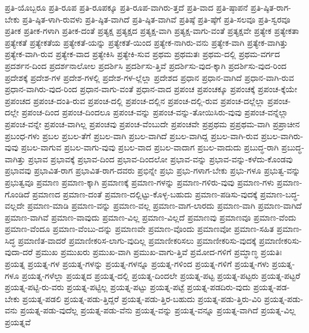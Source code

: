 {ಪ್ರತಿ-ಯೊಬ್ಬರೂ
ಪ್ರತಿ-ರೂಪ
ಪ್ರತಿ-ರೂಪಕ್ಕೂ
ಪ್ರತಿ-ರೂಪ-ವಾಗಿರು-ತ್ತದೆ
ಪ್ರತಿ-ವಾದ
ಪ್ರತಿ-ಷ್ಠಾಪನೆ
ಪ್ರತಿ-ಷ್ಠಿತ-ರಾಗ-ಬೇಕು
ಪ್ರತಿ-ಷ್ಠಿತ-ಳಾಗಿ-ರುವಳು
ಪ್ರತಿ-ಷ್ಠಿತ-ವಾಗಿದೆ
ಪ್ರತಿ-ಷ್ಠಿತ-ವಾಗಿವೆ
ಪ್ರತಿಷ್ಠೆ
ಪ್ರತಿ-ಷ್ಠೆಗೆ
ಪ್ರತಿ-ಸಲವೂ
ಪ್ರತಿ-ಸ್ವರವೂ
ಪ್ರತೀಕ
ಪ್ರತೀಕ-ಗಳಾಗಿ
ಪ್ರತೀಕ-ದಂತೆ
ಪ್ರತ್ಯಕ್ಷ
ಪ್ರತ್ಯಕ್ಷದ
ಪ್ರತ್ಯಕ್ಷ-ವಾಗಿ
ಪ್ರತ್ಯಕ್ಷ-ವಾಗು-ವಂತೆ
ಪ್ರತ್ಯಕ್ಷವೇ
ಪ್ರತ್ಯೇಕ
ಪ್ರತ್ಯೇಕತಾ
ಪ್ರತ್ಯೇಕತೆ
ಪ್ರತ್ಯೇಕತೆಯ
ಪ್ರತ್ಯೇಕತೆ-ಯನ್ನು
ಪ್ರತ್ಯೇಕತೆ-ಯಿಂದ
ಪ್ರತ್ಯೇಕ-ನಾಗಿರು-ವನು
ಪ್ರತ್ಯೇಕ-ವಾಗಿ
ಪ್ರತ್ಯೇಕ-ವಾಗಿತ್ತು
ಪ್ರತ್ಯೇಕ-ವಾಗಿ-ರುವ
ಪ್ರತ್ಯೇಕ-ವಾದ
ಪ್ರತ್ಯೇಕಿಸಿ
ಪ್ರತ್ಯೇಕಿ-ಸುವ
ಪ್ರಥಮ
ಪ್ರಥಮತಃ
ಪ್ರಥಮ-ದಲ್ಲಿ
ಪ್ರಥಮ-ವರ್ಗದ
ಪ್ರದರ್ಶನ-ದಿಂದ
ಪ್ರದರ್ಶನಾಲೋಲ
ಪ್ರದರ್ಶಿಸಿ
ಪ್ರದರ್ಶಿಸು-ತ್ತಿವೆ
ಪ್ರದರ್ಶಿಸು-ವುದ-ಕ್ಕಾಗಿ
ಪ್ರದರ್ಶಿಸು-ವುದ-ರಿಂದ
ಪ್ರದೇಶಕ್ಕೆ
ಪ್ರದೇಶ-ಗಳ
ಪ್ರದೇಶ-ಗಳಲ್ಲಿ
ಪ್ರದೇಶ-ಗಳ-ಲ್ಲೆಲ್ಲಾ
ಪ್ರದೇಶದ
ಪ್ರಧಾನ
ಪ್ರಧಾನ-ವಾಗಿದೆ
ಪ್ರಧಾನ-ವಾಗಿ-ರುವ
ಪ್ರಧಾನ-ವಾಗಿರು-ವುದ-ರಿಂದ
ಪ್ರಧಾನ-ವಾಗು-ವಂತೆ
ಪ್ರಧಾನ-ವಾದ
ಪ್ರಪಂಚ
ಪ್ರಪಂಚಕ್ಕೂ
ಪ್ರಪಂಚಕ್ಕೆ
ಪ್ರಪಂಚ-ಕ್ಕೆಯೇ
ಪ್ರಪಂಚದ
ಪ್ರಪಂಚ-ದಂತಿ-ರುವ
ಪ್ರಪಂಚ-ದಲ್ಲಿ
ಪ್ರಪಂಚ-ದಲ್ಲಿನ
ಪ್ರಪಂಚ-ದಲ್ಲಿ-ರುವ
ಪ್ರಪಂಚ-ದಲ್ಲೆಲ್ಲಾ
ಪ್ರಪಂಚ-ದಲ್ಲೇ
ಪ್ರಪಂಚ-ದಿಂದ
ಪ್ರಪಂಚ-ದಿಂದಲೂ
ಪ್ರಪಂಚ-ವನ್ನು
ಪ್ರಪಂಚ-ವನ್ನು-ತೋಯಿಸಿರು-ವುವು
ಪ್ರಪಂಚ-ವನ್ನೆಲ್ಲಾ
ಪ್ರಪಂಚ-ವನ್ನೇ
ಪ್ರಪಂಚ-ವಾಗಿಲ್ಲ
ಪ್ರಪಂಚವು
ಪ್ರಪಂಚ-ವೆಂಬುದೇ
ಪ್ರಪಂಚವೇ
ಪ್ರಪ್ರಥಮ
ಪ್ರಪ್ರಥಮ-ವಾಗಿ
ಪ್ರಪ್ರಾಚೀನ
ಪ್ರಬಂಧ-ಗಳು
ಪ್ರಬಲ
ಪ್ರಬಲ-ತೆಗೆ
ಪ್ರಬಲ-ವಾಗಿ
ಪ್ರಬಲ-ವಾಗಿದೆ
ಪ್ರಬಲ-ವಾಗಿದ್ದ
ಪ್ರಬಲ-ವಾಗಿ-ರುವ
ಪ್ರಬಲ-ವಾಗಿರು-ವುವು
ಪ್ರಬಲ-ವಾಗುವ
ಪ್ರಬಲ-ವಾಗು-ವುವು
ಪ್ರಬಲ-ವಾದ
ಪ್ರಬಲ-ವಾದಾಗ
ಪ್ರಬಲ-ವಾದುದು
ಪ್ರಬುದ್ಧ-ರಾಗಿ
ಪ್ರಬುದ್ಧ-ವಾಗಿತ್ತು
ಪ್ರಭಾವ
ಪ್ರಭಾವಕ್ಕೆ
ಪ್ರಭಾವ-ದಿಂದ
ಪ್ರಭಾವ-ದಿಂದಲೋ
ಪ್ರಭಾವ-ವನ್ನು
ಪ್ರಭಾವ-ವನ್ನು-ಕಳೆದು-ಕೊಂಡವು
ಪ್ರಭಾವವು
ಪ್ರಭಾವಿತ-ರಾಗ
ಪ್ರಭಾವಿತ-ರಾಗ-ದವರು
ಪ್ರಭಿನ್ನೇ
ಪ್ರಭು
ಪ್ರಭು-ಗಳಾಗ-ಬೇಕು
ಪ್ರಭು-ಗಳೂ
ಪ್ರಭುತ್ವ-ವನ್ನು
ಪ್ರಭುತ್ವವೂ
ಪ್ರಮಾಣ
ಪ್ರಮಾಣ-ಕ್ಕಾಗಿ
ಪ್ರಮಾಣಕ್ಕೆ
ಪ್ರಮಾಣ-ಗಳನ್ನು
ಪ್ರಮಾಣ-ಗಳಿರು-ವುವು
ಪ್ರಮಾಣ-ಗಳು
ಪ್ರಮಾಣ-ಗೊಂಡಿದೆ
ಪ್ರಮಾಣದ
ಪ್ರಮಾಣ-ದಂತೆ
ಪ್ರಮಾಣ-ದಲ್ಲಿಟ್ಟು-ಕೊಳ್ಳ-ಬಹುದು
ಪ್ರಮಾಣ-ಪಡಿಸು-ವುದಕ್ಕೆ
ಪ್ರಮಾಣ-ಬದ್ಧ-ವಲ್ಲದೇ
ಪ್ರಮಾಣ-ಮಾಡಿ
ಪ್ರಮಾಣ-ವನ್ನು
ಪ್ರಮಾಣ-ವಲ್ಲ
ಪ್ರಮಾಣ-ವಾಗ-ಲಾರದು
ಪ್ರಮಾಣ-ವಾಗಿ
ಪ್ರಮಾಣ-ವಾಗಿದೆ
ಪ್ರಮಾಣ-ವಾಗಿವೆ
ಪ್ರಮಾಣ-ವಾವುದು
ಪ್ರಮಾಣ-ವಿಲ್ಲ
ಪ್ರಮಾಣ-ವಿಲ್ಲದೆ
ಪ್ರಮಾಣವು
ಪ್ರಮಾಣವೂ
ಪ್ರಮಾಣ-ವೆಂದು
ಪ್ರಮಾಣ-ವೆಂದೂ
ಪ್ರಮಾಣ-ವೆಂಬು-ದನ್ನು
ಪ್ರಮಾಣವೇ
ಪ್ರಮಾಣ-ವೊಂದು
ಪ್ರಮಾಣವೋ
ಪ್ರಮಾಣ-ಸಹಿತ
ಪ್ರಮಾಣ-ಸಿದ್ಧ
ಪ್ರಮಾಣಿತ-ವಾದರೆ
ಪ್ರಮಾಣೀಕರಿಸ-ಲಾಗು-ವುದಿಲ್ಲ
ಪ್ರಮಾಣೀಕರಿಸಲು
ಪ್ರಮಾಣೀಕರಿಸು-ವುದಕ್ಕೆ
ಪ್ರಮಾಣೀಕರಿಸು-ವುದಾ-ದರೆ
ಪ್ರಮುಖ
ಪ್ರಮುಖರು
ಪ್ರಮುಖ-ವಾಗಿ
ಪ್ರಮುಖ-ವಾಗು-ತ್ತಿವೆ
ಪ್ರಮೋದ-ಗಳಿಗೆ
ಪ್ರಮ್ಧಾಣ್ಧ
ಪ್ರಯತಿಃ
ಪ್ರಯತ್ನ
ಪ್ರಯತ್ನ-ಗಳ
ಪ್ರಯತ್ನ-ಗಳನ್ನು
ಪ್ರಯತ್ನ-ಗಳನ್ನೂ
ಪ್ರಯತ್ನ-ಗಳಿಂದ
ಪ್ರಯತ್ನ-ಗಳಿಗೆ
ಪ್ರಯತ್ನ-ಗಳು
ಪ್ರಯತ್ನ-ಗಳೂ
ಪ್ರಯತ್ನ-ಗಳೆಲ್ಲಾ
ಪ್ರಯತ್ನದ
ಪ್ರಯತ್ನ-ದಲ್ಲಿ
ಪ್ರಯತ್ನ-ದಿಂದಲೇ
ಪ್ರಯತ್ನ-ಪಟ್ಟ
ಪ್ರಯತ್ನ-ಪಟ್ಟರು
ಪ್ರಯತ್ನ-ಪಟ್ಟರೆ
ಪ್ರಯತ್ನ-ಪಟ್ಟಿ-ರು-ವರು
ಪ್ರಯತ್ನ-ಪಟ್ಟಿಲ್ಲ
ಪ್ರಯತ್ನ-ಪಟ್ಟು
ಪ್ರಯತ್ನ-ಪಟ್ಟೆ
ಪ್ರಯತ್ನ-ಪಡದಿರು-ವುದು
ಪ್ರಯತ್ನ-ಪಡ-ಬೇಕು
ಪ್ರಯತ್ನ-ಪಡಲಿ
ಪ್ರಯತ್ನ-ಪಡು-ತ್ತಿದ್ದರೆ
ಪ್ರಯತ್ನ-ಪಡು-ತ್ತಿರ-ಬಹುದು
ಪ್ರಯತ್ನ-ಪಡು-ತ್ತಿರು-ವಿರಿ
ಪ್ರಯತ್ನ-ಪಡು-ವನು
ಪ್ರಯತ್ನ-ಪಡು-ವುದೆಲ್ಲ
ಪ್ರಯತ್ನ-ಪಡು-ವೆನು
ಪ್ರಯತ್ನ-ವನ್ನು
ಪ್ರಯತ್ನ-ವನ್ನೂ
ಪ್ರಯತ್ನ-ವಾಗಿದೆ
ಪ್ರಯತ್ನ-ವಿಲ್ಲ
ಪ್ರಯತ್ನವೆ
}
